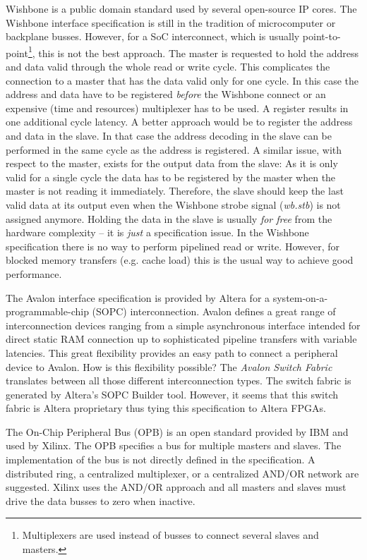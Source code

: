 Wishbone \cite{soc:wishbone} is a public domain standard used by
several open-source IP cores. The Wishbone interface specification
is still in the tradition of microcomputer or backplane busses.
However, for a SoC interconnect, which is usually
point-to-point\footnote{Multiplexers are used instead of busses to
connect several slaves and masters.}, this is not the best approach.
The master is requested to hold the address and data valid through
the whole read or write cycle. This complicates the connection to a
master that has the data valid only for one cycle. In this case the
address and data have to be registered \emph{before} the Wishbone
connect or an expensive (time and resources) multiplexer has to be
used. A register results in one additional cycle latency. A better
approach would be to register the address and data in the slave. In
that case the address decoding in the slave can be performed in the
same cycle as the address is registered. A similar issue, with
respect to the master, exists for the output data from the slave: As
it is only valid for a single cycle the data has to be registered by
the master when the master is not reading it immediately. Therefore,
the slave should keep the last valid data at its output even when
the Wishbone strobe signal (\emph{wb.stb}) is not assigned anymore.
Holding the data in the slave is usually \emph{for free} from the
hardware complexity -- it is \emph{just} a specification issue. In
the Wishbone specification there is no way to perform pipelined read
or write. However, for blocked memory transfers (e.g. cache load)
this is the usual way to achieve good performance.


The Avalon \cite{soc:avalon} interface specification is provided by
Altera for a system-on-a-programmable-chip (SOPC) interconnection.
Avalon defines a great range of interconnection devices ranging from
a simple asynchronous interface intended for direct static RAM
connection up to sophisticated pipeline transfers with variable
latencies. This great flexibility provides an easy path to connect a
peripheral device to Avalon. How is this flexibility possible? The
\emph{Avalon Switch Fabric} translates between all those different
interconnection types. The switch fabric is generated by Altera's
SOPC Builder tool. However, it seems that this switch fabric is
Altera proprietary thus tying this specification to Altera FPGAs.

The On-Chip Peripheral Bus (OPB) \cite{soc:opb} is an open standard
provided by IBM and used by Xilinx. The OPB specifies a bus for
multiple masters and slaves. The implementation of the bus is not
directly defined in the specification. A distributed ring, a
centralized multiplexer, or a centralized AND/OR network are
suggested. Xilinx uses the AND/OR approach and all masters and
slaves must drive the data busses to zero when inactive.


